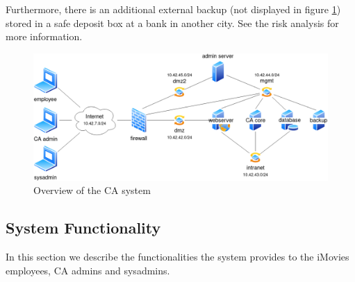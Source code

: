 \documentclass[english]{article}
\begin{document}
Furthermore, there is an additional external backup (not displayed in figure \ref{overview}) stored in a safe deposit box at a bank in another city. See the risk analysis for more information.

\begin{figure}
  \includegraphics[width=\textwidth]{diagram.png}
  \caption{Overview of the CA system}
  \label{overview}
\end{figure}



\subsection{System Functionality}

In this section we describe the functionalities the system provides to the iMovies employees, CA admins and sysadmins.
\end{document}
